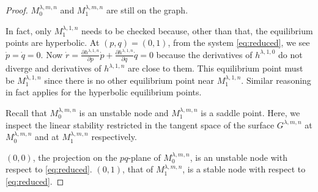 \documentclass[a4paper,11pt]{article}
\def\red{\color{red}}
\begin{document}
\begin{proof}
\medskip {}
 $M_0^{\lambda,m,n}$ and $M_1^{\lambda,m,n}$ are still on the graph.
\medskip

In fact, only $M_1^{ \lambda,1,n}$ needs to be checked because, other than that, the equilibrium points are hyperbolic. At $(p,q)=(0,1)$, from the system \eqref{eq:reduced}, we see $\dot{p} = \dot{q} = 0$. Now $\dot{r} = \frac{\partial h^{\lambda,1,n}}{\partial p} \dot{p} + \frac{\partial h^{\lambda,1,n}}{\partial q} \dot{q} = 0$ %
because the derivatives of $h^{\lambda,1,0}$ do not diverge and derivatives of $h^{\lambda,1,n}$ are close to them. This equilibrium point must be $M_1^{\lambda,1,n}$ since there is no other equilibrium point near $M_1^{\lambda,1,n}$. Similar reasoning in fact applies for the hyperbolic equilibrium points.

\medskip
Recall that $M_0^{\lambda,m,n}$ is an unstable node and $M_1^{\lambda,m,n}$ is a saddle point. Here, we inspect the linear stability restricted in the tangent space of the surface $G^{\lambda,m,n}$ at $M_0^{\lambda,m,n}$ and at $M_1^{\lambda,m,n}$ respectively.

\medskip {}
 $(0,0)$, the projection on the $pq$-plane of $M_0^{\lambda,m,n}$, is an unstable node with respect to \eqref{eq:reduced}. $(0,1)$, that of $M_1^{\lambda,m,n}$, is a stable node with respect to \eqref{eq:reduced}.
\medskip


\end{proof}
\end{document}
